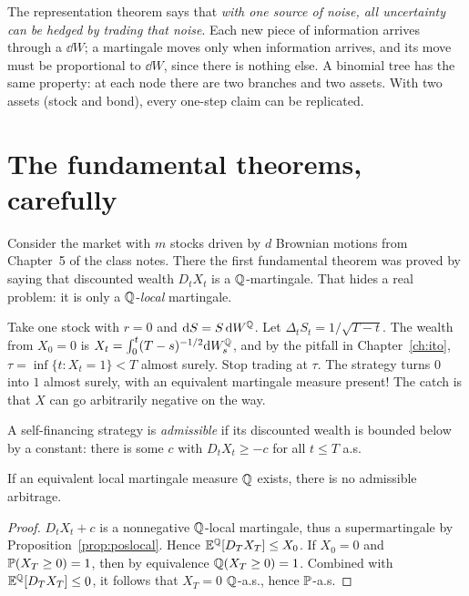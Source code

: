 \begin{intuition}
The representation theorem says that \emph{with one source of noise, all uncertainty can be hedged by trading that noise}. Each new piece of information arrives through a $\dd W$; a martingale moves only when information arrives, and its move must be proportional to $\dd W$, since there is nothing else. A binomial tree has the same property: at each node there are two branches and two assets. With two assets (stock and bond), every one-step claim can be replicated.
\end{intuition}

\section{The fundamental theorems, carefully}\label{sec:admiss}

Consider the market with $m$ stocks driven by $d$ Brownian motions from Chapter~5 of the class notes. There the first fundamental theorem was proved by saying that discounted wealth $D_tX_t$ is a $\mathbb{Q}$-martingale. That hides a real problem: it is only a $\mathbb{Q}$-\emph{local} martingale.

\begin{example}
Take one stock with $r=0$ and $\mathrm{d} S=S\,\mathrm{d} W^{\mathbb{Q}}$. Let $\Delta_tS_t=1/\sqrt{T-t}$. The wealth from $X_0=0$ is $X_t=\int_0^t(T-s)^{-1/2}\mathrm{d} W^{\mathbb{Q}}_s$, and by the pitfall in Chapter~\ref{ch:ito}, $\tau=\inf\{t:X_t=1\}<T$ almost surely. Stop trading at $\tau$. The strategy turns $0$ into $1$ almost surely, with an equivalent martingale measure present! The catch is that $X$ can go arbitrarily negative on the way.
\end{example}

\begin{definition}
A self-financing strategy is \emph{admissible} if its discounted wealth is bounded below by a constant: there is some $c$ with $D_tX_t\ge-c$ for all $t\le T$ a.s.
\end{definition}

\begin{theorem}\label{thm:ftap1}
If an equivalent local martingale measure $\mathbb{Q}$ exists, there is no admissible arbitrage.
\end{theorem}
\begin{proof}
$D_tX_t+c$ is a nonnegative $\mathbb{Q}$-local martingale, thus a supermartingale by Proposition~\ref{prop:poslocal}. Hence $\mathbb{E}^{\mathbb{Q}}[D_TX_T]\le X_0$. If $X_0=0$ and $\mathbb{P}(X_T\ge0)=1$, then by equivalence $\mathbb{Q}(X_T\ge0)=1$. Combined with $\mathbb{E}^{\mathbb{Q}}[D_TX_T]\le0$, it follows that $X_T=0$ $\mathbb{Q}$-a.s., hence $\mathbb{P}$-a.s.
\end{proof}

